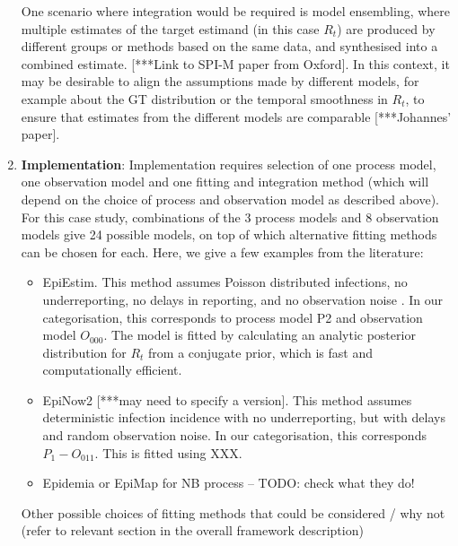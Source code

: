 \documentclass{article}
\begin{document}
\begin{enumerate}
One scenario where integration would be required is model ensembling, where multiple estimates of the target estimand (in this case $R_t$) are produced by different groups or methods based on the same data, and synthesised into a combined estimate. [***Link to SPI-M paper from Oxford]. In this context, it may be desirable to align the assumptions made by different models, for example about the GT distribution or the temporal smoothness in $R_t$, to ensure that estimates from the different models are  comparable [***Johannes’ paper].

\item \textbf{Implementation}: Implementation requires selection of one process model, one observation model and one fitting and integration method (which will depend on the choice of process and observation model as described above). For this case study, combinations of the 3 process models and 8 observation models give 24 possible models, on top of which alternative fitting methods can be chosen for each. Here, we give a few examples from the literature:
\begin{itemize}
    \item EpiEstim. This method assumes Poisson distributed infections, no underreporting, no delays in reporting, and no observation noise \citep{cori2013new}. In our categorisation, this corresponds to process model P2 and observation model $O_{000}$. The model is fitted by calculating an analytic posterior distribution for $R_t$ from a conjugate prior, which is fast and computationally efficient. 
    \item EpiNow2 [***may need to specify a version]. This method assumes deterministic infection incidence with no underreporting, but with delays and random observation noise. In our categorisation, this corresponds $P_1-O_{011}$. This is fitted using XXX.
    \item Epidemia or EpiMap for NB process – TODO: check what they do!
\end{itemize}

Other possible choices of fitting methods that could be considered / why not (refer to relevant section in the overall framework description)
 \end{enumerate}
 
\end{document}
